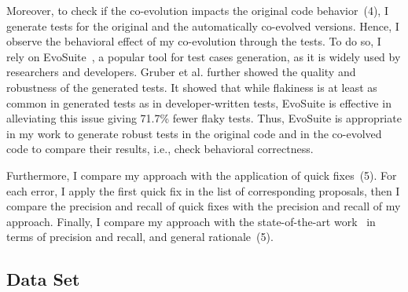 	Moreover, to check if the co-evolution impacts the original code behavior~(4), I generate tests for the original and the automatically co-evolved versions. Hence, I observe the behavioral effect of my co-evolution through the tests. To do so, I rely on EvoSuite~\cite{fraser2011evosuite}, a popular tool for test cases generation, as it is widely used by researchers and developers. 
	Gruber et al. \cite{gruber2023automatic} further showed the quality and robustness of the generated tests. It showed that while flakiness is at least as common in generated tests as in developer-written tests, EvoSuite is effective in alleviating this issue giving 71.7\% fewer flaky tests. Thus, EvoSuite is appropriate in my work to generate robust tests in the original code and in the co-evolved code to compare their results, i.e., check behavioral correctness.
	
	Furthermore, I compare my approach with the application of quick fixes~(5). For each error, I apply the first quick fix in the list of corresponding proposals, then I compare the precision and recall of quick fixes with the precision and recall of my approach.
	Finally, I compare my approach with the state-of-the-art work~\cite{Khelladi2020} in terms of precision and recall, and general rationale~(5).
	
	
	
	
	
	






\subsection{Data Set}

